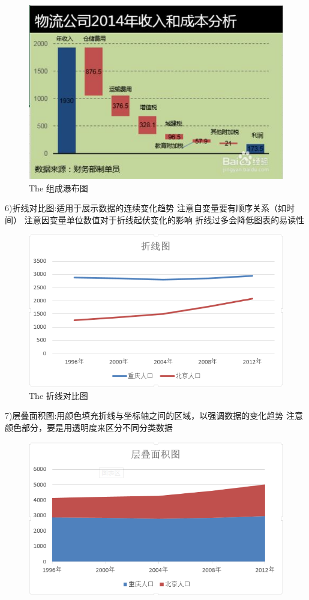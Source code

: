 \documentclass{article}
\begin{document}
\begin{itemize}
\begin{figure}[h!]
    		\centering
    		\includegraphics[scale=0.5]{zucheng}
    		\caption{The 组成瀑布图}
    		\label{fig:zucheng}
    		\end{figure}
    		6)折线对比图:适用于展示数据的连续变化趋势
    		注意自变量要有顺序关系（如时间）
    		注意因变量单位数值对于折线起伏变化的影响
    		折线过多会降低图表的易读性\par
    		\begin{figure}[h!]
    		\centering
    		\includegraphics[scale=0.7]{zhexian}
    		\caption{The 折线对比图}
    		\label{fig:zhuzhuangtu}
    		\end{figure}
    		7)层叠面积图:用颜色填充折线与坐标轴之间的区域，以强调数据的变化趋势
    		注意颜色部分，要是用透明度来区分不同分类数据\par  
    		\begin{figure}[h!]
    		\centering
    		\includegraphics[scale=0.7]{cengdie}

\end{figure}
\end{itemize}
\end{document}
